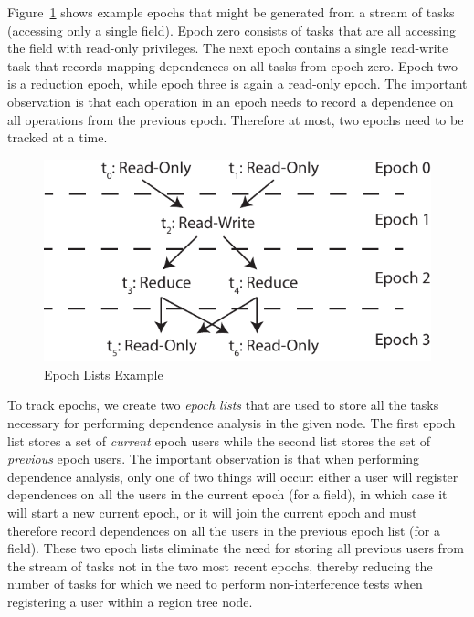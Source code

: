 Figure~\ref{fig:epochlist} shows example
epochs that might be generated from a stream
of tasks (accessing only a single field).
Epoch zero consists of tasks that are all 
accessing the field with read-only privileges. 
The next epoch contains a single read-write
task that records mapping dependences on all
tasks from epoch zero.  Epoch two is a reduction
epoch, while epoch three is again a read-only
epoch. The important observation is that each
operation in an epoch needs to record a dependence
on all operations from the previous epoch.
Therefore at most, two epochs need to be tracked
at a time.

\begin{figure}[t]
\centering
\includegraphics[scale=0.7]{figs/EpochLists}
\caption{Epoch Lists Example\label{fig:epochlist}}
\end{figure}

To track epochs, we create two {\em epoch lists}
that are used to store all the tasks
necessary for performing dependence analysis
in the given node.  The first epoch list stores 
a set of {\em current} epoch users while the 
second list stores the set of {\em previous} 
epoch users. The important observation is that when
performing dependence analysis, only one of
two things will occur: either a user 
will register dependences on all the users 
in the current epoch (for a field), in which
case it will start a new current epoch, or it
will join the current epoch and must therefore
record dependences on all the users 
in the previous epoch list (for a field).
These two epoch lists eliminate the need for 
storing all previous users from the stream of 
tasks not in the two most recent epochs, thereby 
reducing the number of tasks for which we need 
to perform non-interference tests when 
registering a user within a region tree node.

